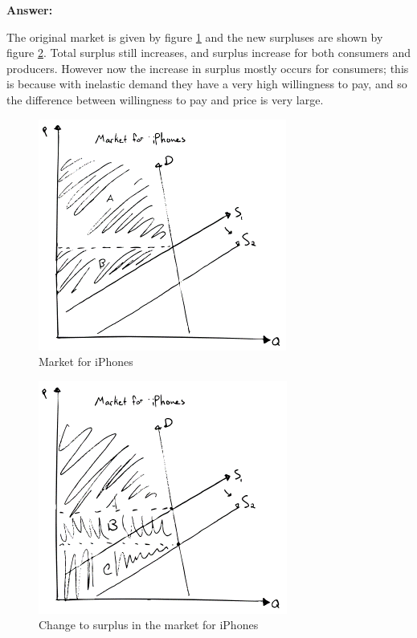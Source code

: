 \documentclass[12pt]{article}
\begin{document}
\vspace{2mm}

\textbf{Answer:}

\vspace{2mm}

The original market is given by figure \ref{fig:iphone3} and the new surpluses are shown by figure \ref{fig:iphone4}. Total surplus still increases, and surplus increase for both consumers and producers. However now the increase in surplus mostly occurs for consumers; this is because with inelastic demand they have a very high willingness to pay, and so the difference between willingness to pay and price is very large.

\begin{figure}
    \centering
    \includegraphics[width=.5\textwidth]{../../figs/iphone3.png}
    \caption{Market for iPhones}
    \label{fig:iphone3}
\end{figure}

\begin{figure}
    \centering
    \includegraphics[width=.5\textwidth]{../../figs/iphone4.png}
    \caption{Change to surplus in the market for iPhones}
    \label{fig:iphone4}
\end{figure}
\end{document}
